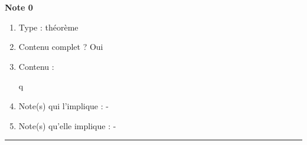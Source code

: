 \documentclass[12pt,a4paper]{article}
\begin{document}
\noindent\textbf{ Note 0}
\begin{enumerate}[label=$-$]
\item Type : théorème
\item Contenu complet ? Oui
\item Contenu :\\
\hspace*{.5cm}\begin{minipage}{20cm}
     q 
\end{minipage}
\item Note(s) qui l'implique : -
\item Note(s) qu'elle implique : -
\end{enumerate}
\vspace{.2cm}
\hrule
\end{document}

